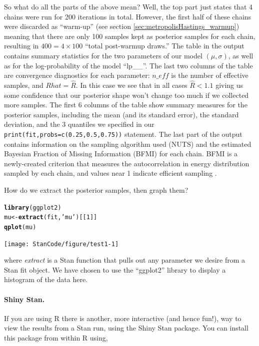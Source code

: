 \documentclass[11pt,fullpage]{book}
\newcommand{\hlnum}[1]{\textcolor[rgb]{0.686,0.059,0.569}{#1}}%
\newcommand{\hlstr}[1]{\textcolor[rgb]{0.192,0.494,0.8}{#1}}%
\newcommand{\hlstd}[1]{\textcolor[rgb]{0.345,0.345,0.345}{#1}}%
\newcommand{\hlkwb}[1]{\textcolor[rgb]{0.69,0.353,0.396}{#1}}%
\newcommand{\hlkwd}[1]{\textcolor[rgb]{0.737,0.353,0.396}{\textbf{#1}}}%
\newenvironment{knitrout}{}{} %
\begin{document}
So what do all the parts of the above mean? Well, the top part just states that 4 chains were run for 200 iterations in total. However, the first half of these chains were discarded as ``warm-up'' (see section \ref{sec:metropolisHastings_warmup}) meaning that there are only 100 samples kept as posterior samples for each chain, resulting in $400=4\times 100$ ``total post-warmup draws.'' The table in the output contains summary statistics for the two parameters of our model $(\mu,\sigma)$, as well as for the log-probability of the model ``lp\_\_''. The last two columns of the table are convergence diagnostics for each parameter: $n\_eff$ is the number of effective samples, and $Rhat = \hat{R}$. In this case we see that in all cases $\hat{R}<1.1$ giving us some confidence that our posterior shape won't change too much if we collected more samples. The first 6 columns of the table show summary measures for the posterior samples, including the mean (and its  standard error), the standard deviation, and the 3 quantiles we specified in our \texttt{print(fit,probs=c(0.25,0.5,0.75))} statement. The last part of the output contains information on the sampling algorithm used (NUTS) and the estimated Bayesian Fraction of Missing Information (BFMI) for each chain. BFMI is a newly-created criterion that measures the autocorrelation in energy distribution sampled by each chain, and values near 1 indicate efficient sampling \cite{betancourt2016diagnosing}.

How do we extract the posterior samples, then graph them?

\begin{knitrout}
\begin{alltt}
\hlkwd{library}\hlstd{(ggplot2)}
\hlstd{mu} \hlkwb{<-} \hlkwd{extract}\hlstd{(fit,}\hlstr{'mu'}\hlstd{)[[}\hlnum{1}\hlstd{]]}
\hlkwd{qplot}\hlstd{(mu)}
\end{alltt}
\texttt{[image: StanCode/figure/test1-1]} 
\end{knitrout}

where \textit{extract} is a Stan function that pulls out any parameter we desire from a Stan fit object. We have chosen to use the ``ggplot2'' library to display a histogram of the data here.

\paragraph{Shiny Stan.} If you are using R there is another, more interactive (and hence fun!), way to view the results from a Stan run, using the Shiny Stan package. You can install this package from within R using,
\end{document}
